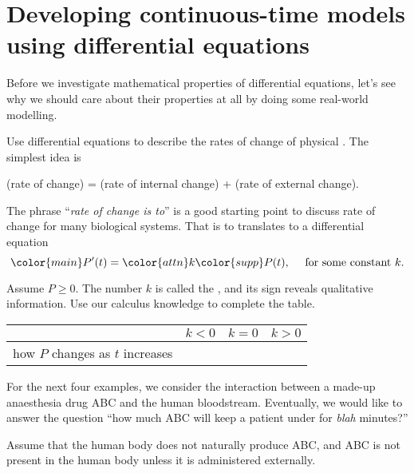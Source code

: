 \documentclass[../main.tex]{subfiles}
\begin{document}
 \section{Developing continuous-time models using differential equations}

Before we investigate mathematical properties of differential equations, let's see why we should care about their properties at all by doing some real-world modelling. 

\begin{method} \label{method:diff-eq-model}
  Use differential equations to describe the rates of change of physical .  The simplest idea is
  \begin{center}
    (rate of change) = (rate of internal change) + (rate of external change).
  \end{center}
\end{method}

The phrase ``\emph{rate of change is  to}'' is a good starting point to discuss rate of  change for many biological systems.  That  is  to  translates to a differential equation 
\[
  {\color{main}P'(t)} = {\color{attn} k} {\color{supp} P(t)},\quad \text{ for some constant } k.
\]

Assume \(P \ge 0\).  The number \(k\) is called the , and its sign reveals qualitative information.  Use our calculus knowledge to complete the table.

\begin{table}[H]
  \centering
  \begin{tabular}{r|p{1.5in}|p{1.5in}|p{1.5in}}
  & \(k < 0\) & \(k = 0\) & \(k > 0\) \\ \midrule
    how \(P\) changes as \(t\) increases & & & \\[2ex]
  \end{tabular}
\end{table}

For the next four examples, we consider the interaction between a made-up anaesthesia drug ABC and the human bloodstream. Eventually, we would like to answer the question ``how much ABC will keep a patient under for \emph{blah} minutes?''

Assume that the human body does not naturally produce ABC, and ABC is not present in the human body unless it is administered externally. 
\end{document}
